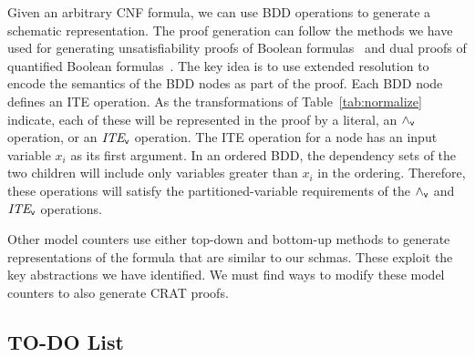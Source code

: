 \documentclass{llncs}
\newcommand{\pand}{\mathbin{\land_{\sf v}}}
\newcommand{\pite}{\mbox{\it ITE}_{\sf v}}
\begin{document}
Given an arbitrary CNF formula, we can use BDD operations to generate
a schematic representation.  The proof generation can follow the
methods we have used for generating unsatisfiability proofs of Boolean
formulas~\cite{bryant:tacas:2021} and dual proofs of quantified
Boolean formulas~\cite{bryant:cade:2021}.  The key idea is to use
extended resolution to encode the semantics of the BDD nodes as part
of the proof.  Each BDD node defines an ITE operation.  As the
transformations of Table~\ref{tab:normalize} indicate, each of these
will be represented in the proof by a literal, an $\pand$ operation,
or an $\pite$ operation.  The ITE operation for a node has an input
variable $x_i$ as its first argument.  In an ordered BDD, the
dependency sets of the two children will include only variables
greater than $x_i$ in the ordering.  Therefore, these operations will
satisfy the partitioned-variable requirements of the  $\pand$ and $\pite$ operations.

Other model counters use either top-down and bottom-up methods to
generate representations of the formula that are similar to our
schmas.  These exploit the key abstractions we have identified.  We
must find ways to modify these model counters to also generate CRAT
proofs.

\subsection{TO-DO List}
\end{document}
